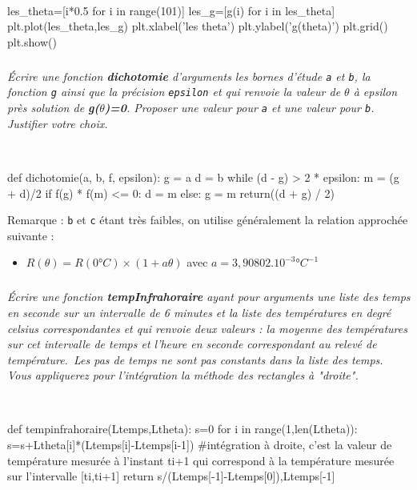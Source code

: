 \documentclass[10pt,fleqn]{article} %
\begin{document}
\ifprof
\begin{corrige}~\
\begin{python}
les_theta=[i*0.5 for i in range(101)]
les_g=[g(i) for i in les_theta]
plt.plot(les_theta,les_g)
plt.xlabel('les theta')
plt.ylabel('g(theta)')
plt.grid()
plt.show()
\end{python}
\end{corrige}
\else
\fi

\subparagraph{}
\textit{Écrire une fonction \textbf{dichotomie} d'arguments les bornes d'étude \texttt{a} et \texttt{b}, la fonction \texttt{g} ainsi que la précision \texttt{epsilon} et qui renvoie la valeur de $\theta$ à epsilon près solution de \textbf{g($\theta$)=0}. Proposer une valeur pour \texttt{a} et une valeur pour \texttt{b}. Justifier votre choix.}

\ifprof
\begin{corrige}~\
\begin{python}
def dichotomie(a, b, f, epsilon):
    g = a
    d = b
    while (d - g) > 2 * epsilon:
        m = (g + d)/2
        if f(g) * f(m) <= 0:
            d = m
        else:
            g = m
    return((d + g) / 2)
\end{python}
\end{corrige}
\else
\fi

\vspace{0.5cm}
Remarque : \texttt{b} et \texttt{c} étant très faibles, on utilise généralement la relation approchée suivante :
\begin{itemize}
	\item $R(\theta)=R(0°C)\times(1+a\theta)$ avec $a=3,90802.10^{-3}°C^{-1}$
\end{itemize}

\subparagraph{}
\textit{Écrire une fonction \textbf{tempInfrahoraire} ayant pour arguments une liste des temps en seconde sur un intervalle de 6 minutes et la liste des températures en degré celsius correspondantes et qui renvoie deux valeurs : la moyenne des températures sur cet intervalle de temps et l'heure en seconde correspondant au relevé de température.\
Les pas de temps ne sont pas constants dans la liste des temps. Vous appliquerez pour l'intégration la méthode des rectangles à "droite".}

\ifprof
\begin{corrige}~\
\begin{python}
def tempinfrahoraire(Ltemps,Ltheta):
    s=0
    for i in range(1,len(Ltheta)):
        s=s+Ltheta[i]*(Ltemps[i]-Ltemps[i-1]) #intégration à droite, c'est la valeur de température mesurée à l'instant t{i+1} qui correspond à la température mesurée sur l'intervalle [t{i},t{i+1}]
    return s/(Ltemps[-1]-Ltemps[0]),Ltemps[-1]
\end{python}
\end{corrige}
\else
\fi
\end{document}
